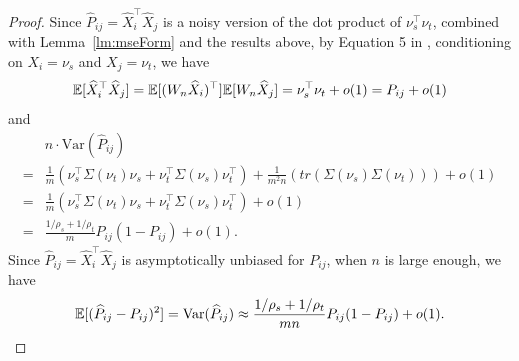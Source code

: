 \begin{proof}
Since $\hat{P}_{ij} = \hat{X}_i^{\top} \hat{X}_j$ is a noisy version of the dot product of $\nu_s^{\top} \nu_t$, combined with Lemma~\ref{lm:mseForm} and the results above, by Equation 5 in \citep{brown1977means}, conditioning on $X_i = \nu_s$ and $X_j = \nu_t$, we have
\[
	\mathbb{E}[\widehat{X}_i^{\top} \widehat{X}_j] = \mathbb{E}[(W_n \widehat{X}_i)^{\top}] \mathbb{E}[W_n \widehat{X}_j] = \nu_s^{\top} \nu_t+o(1) = P_{ij}+o(1)
\]
and
\begin{align*}
	& n \cdot \mathrm{Var} (\hat{P}_{ij}) \\
    = & \frac{1}{m} \left( \nu_s^{\top} \Sigma(\nu_t) \nu_s + \nu_t^{\top} \Sigma(\nu_s) \nu_t^{\top} \right)
    + \frac{1}{m^2 n} \left( tr(\Sigma(\nu_s) \Sigma(\nu_t)) \right) +o(1)\\
    = & \frac{1}{m} \left( \nu_s^{\top} \Sigma(\nu_t) \nu_s + \nu_t^{\top} \Sigma(\nu_s) \nu_t^{\top} \right)+o(1) \\
    = & \frac{1/\rho_s + 1/\rho_t}{m} P_{ij}(1-P_{ij}) + o(1).
\end{align*}
Since $\hat{P}_{ij} = \hat{X}_i^{\top} \hat{X}_j$ is asymptotically unbiased for $P_{ij}$, when $n$ is large enough, we have
\[
    \mathbb{E}[(\widehat{P}_{ij} - P_{ij})^2] = \mathrm{Var}(\widehat{P}_{ij}) \approx
    \frac{1/\rho_s + 1/\rho_t}{m n} P_{ij}(1-P_{ij})+o(1).
\]
\end{proof}



